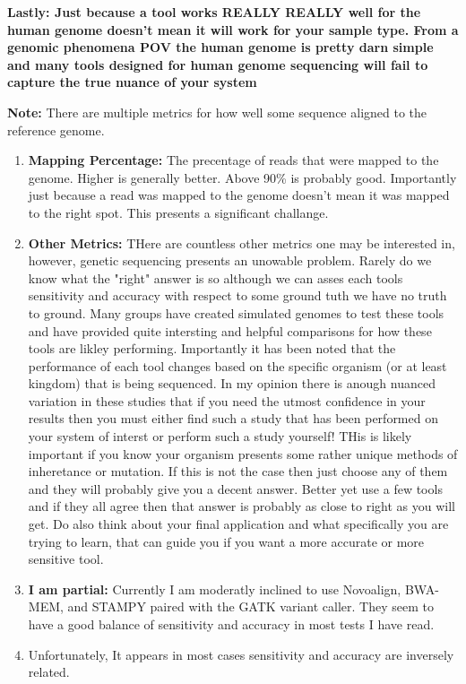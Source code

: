 \documentclass{article}
\begin{document}
    \textbf{Lastly: Just because a tool works REALLY REALLY well for the human genome doesn't mean it will work for your sample type.  From a genomic phenomena POV the human genome is pretty darn simple and many tools designed for human genome sequencing will fail to capture the true nuance of your system}


    \textbf{Note:} There are multiple metrics for how well some sequence aligned to the reference genome.
    \begin{enumerate}
        \item \textbf{Mapping Percentage:} The precentage of reads that were mapped to the genome.  Higher is generally better.  Above 90\% is probably good.  Importantly just because a read was mapped to the genome doesn't mean it was mapped to the right spot.  This presents a significant challange.
        \item \textbf{Other Metrics:}  THere are countless other metrics one may be interested in, however, genetic sequencing presents an unowable problem. Rarely do we know what the "right" answer is so although we can asses each tools sensitivity and accuracy with respect to some ground tuth we have no truth to ground.   Many groups have created simulated genomes to test these tools and have provided quite intersting and helpful comparisons for how these tools are likley performing.  Importantly it has been noted that the performance of each tool changes based on the specific organism (or at least kingdom) that is being sequenced.  In my opinion there is anough nuanced variation in these studies that if you need the utmost confidence in your results then you must either find such a study that has been performed on your system of interst or perform such a study yourself! THis is likely important if you know your organism presents some rather unique methods of inheretance or mutation.  If this is not the case then just choose any of them and they will probably give you a decent answer.   Better yet use a few tools and if they all agree then that answer is probably as close to right as you will get.   Do also think about your final application and what specifically you are trying to learn, that can guide you if you want a more accurate or more sensitive tool.
        \item \textbf{I am partial:}  Currently I am moderatly inclined to use Novoalign, BWA-MEM, and STAMPY paired with the GATK variant caller.   They seem to have a good balance of sensitivity and accuracy in most tests I have read.
        \item Unfortunately, It appears in most cases sensitivity and accuracy are inversely related.
    \end{enumerate}
        
\end{document}
